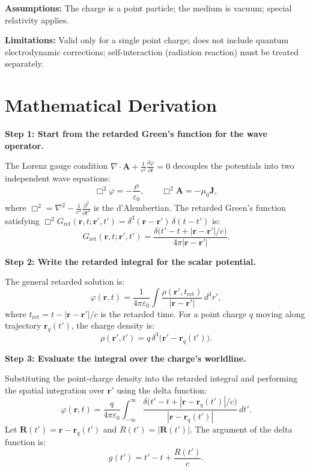 \textbf{Assumptions:} The charge is a point particle; the medium is vacuum; special relativity applies.


\textbf{Limitations:} Valid only for a single point charge; does not include quantum electrodynamic corrections; self-interaction (radiation reaction) must be treated separately.


\section*{Mathematical Derivation}

\textbf{Step 1: Start from the retarded Green's function for the wave operator.}

The Lorenz gauge condition $\nabla\cdot\mathbf{A} + \frac{1}{c^{2}}\frac{\partial\varphi}{\partial t} = 0$ decouples the potentials into two independent wave equations:
\begin{equation}
\Box^{2}\varphi = -\frac{\rho}{\varepsilon_{0}}, \qquad \Box^{2}\mathbf{A} = -\mu_{0}\mathbf{J},
\end{equation}
where $\Box^{2} = \nabla^{2} - \frac{1}{c^{2}}\frac{\partial^{2}}{\partial t^{2}}$ is the d'Alembertian. The retarded Green's function satisfying $\Box^{2}G_{\text{ret}}(\mathbf{r},t;\mathbf{r}',t') = \delta^{3}(\mathbf{r}-\mathbf{r}')\,\delta(t-t')$ is:
\begin{equation}
G_{\text{ret}}(\mathbf{r},t;\mathbf{r}',t') = \frac{\delta\!\bigl(t' - t + |\mathbf{r}-\mathbf{r}'|/c\bigr)}{4\pi|\mathbf{r}-\mathbf{r}'|}.
\end{equation}

\textbf{Step 2: Write the retarded integral for the scalar potential.}

The general retarded solution is:
\begin{equation}
\varphi(\mathbf{r},t) = \frac{1}{4\pi\varepsilon_{0}}\int \frac{\rho(\mathbf{r}',t_{\text{ret}})}{|\mathbf{r}-\mathbf{r}'|}\,d^{3}r',
\label{eq:retarded-phi-integral}
\end{equation}
where $t_{\text{ret}} = t - |\mathbf{r}-\mathbf{r}'|/c$ is the retarded time. For a point charge $q$ moving along trajectory $\mathbf{r}_{q}(t')$, the charge density is:
\begin{equation}
\rho(\mathbf{r}',t') = q\,\delta^{3}\!\bigl(\mathbf{r}' - \mathbf{r}_{q}(t')\bigr).
\end{equation}

\textbf{Step 3: Evaluate the integral over the charge's worldline.}

Substituting the point-charge density into the retarded integral and performing the spatial integration over $\mathbf{r}'$ using the delta function:
\begin{equation}
\varphi(\mathbf{r},t) = \frac{q}{4\pi\varepsilon_{0}}\int_{-\infty}^{\infty} \frac{\delta\!\bigl(t' - t + |\mathbf{r}-\mathbf{r}_{q}(t')|/c\bigr)}{|\mathbf{r}-\mathbf{r}_{q}(t')|}\,dt'.
\end{equation}
Let $\mathbf{R}(t') = \mathbf{r} - \mathbf{r}_{q}(t')$ and $R(t') = |\mathbf{R}(t')|$. The argument of the delta function is:
\begin{equation}
g(t') = t' - t + \frac{R(t')}{c}.
\end{equation}

